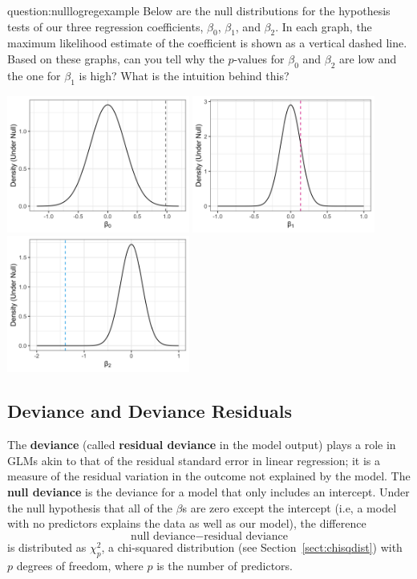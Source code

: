 \begin{question}{question:nulllogregexample}
Below are the null distributions for the hypothesis tests of our three regression coefficients, $\beta_0$, $\beta_1$, and $\beta_2$. In each graph, the maximum likelihood estimate of the coefficient is shown as a vertical dashed line. Based on these graphs, can you tell why the $p$-values for $\beta_0$ and $\beta_2$ are low and the one for $\beta_1$ is high? What is the intuition behind this?
\begin{center}
\includegraphics[width=0.45\textwidth]{img/logreg-example-beta-0.png}
\includegraphics[width=0.45\textwidth]{img/logreg-example-beta-1.png}
\includegraphics[width=0.45\textwidth]{img/logreg-example-beta-2.png}
\end{center}
\end{question}

\subsection{Deviance and Deviance Residuals}

The \textbf{deviance} (called \textbf{residual deviance} in the model output) plays a role in GLMs akin to that of the residual standard error in linear regression; it is a measure of the residual variation in the outcome not explained by the model. The \textbf{null deviance} is the deviance for a model that only includes an intercept. Under the null hypothesis that all of the $\beta$s are zero except the intercept (i.e, a model with no predictors explains the data as well as our model), the difference
$$ \text{null deviance} - \text{residual deviance} $$
is distributed as $\chi^2_p$, a chi-squared distribution (see Section~\ref{sect:chisqdist}) with $p$ degrees of freedom, where $p$ is the number of predictors.
\vspace{5mm}

